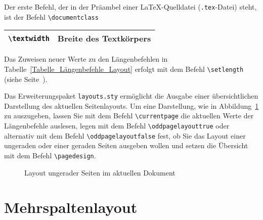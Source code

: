 Der erste Befehl, der in der Präambel einer \LaTeX-Quelldatei (\verb!.tex!-Datei) steht, ist der Befehl \verb!\documentclass!
\begin{document}
\begin{table}[h!tb]
\begin{tabularx}{\textwidth}{lX}
\texttt{\textbackslash textwidth} & Breite des Textkörpers \\
\hline
\end{tabularx}
\end{table}

Das Zuweisen neuer Werte zu den Längenbefehlen in Tabelle~\ref{Tabelle_Längenbefehle_Layout} erfolgt mit dem Befehl \verb!\setlength! (siehe Seite~\pageref{Absatzabstand}).




Das Erweiterungspaket \verb!layouts.sty! ermöglicht die Ausgabe einer übersichtlichen Darstellung des aktuellen Seitenlayouts. Um eine Darstellung, wie in Abbildung~\ref{Abbildung_Ausgabe_layout} zu auszugeben, lassen Sie mit dem Befehl \verb!\currentpage! 
die aktuellen Werte der Längenbefehle auslesen, 
legen mit dem Befehl \verb!\oddpagelayouttrue! oder alternativ mit dem Befehl
\verb!\oddpagelayoutfalse! fest, 
ob Sie das Layout einer ungeraden oder einer geraden Seiten ausgeben wollen und setzen die Übersicht mit dem Befehl \verb!\pagedesign!.


\begin{figure}[htbp]
\currentpage
\oddpagelayouttrue
\pagedesign
\caption{Layout ungerader Seiten im aktuellen Dokument} \label{Abbildung_Ausgabe_layout}
\end{figure}





\section{Mehrspaltenlayout}
\end{document}

